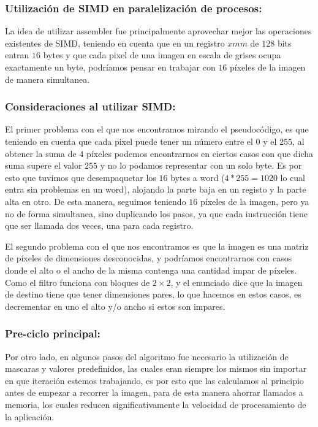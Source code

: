 \subsubsection{Utilización de SIMD en paralelización de procesos:}

La idea de utilizar assembler fue principalmente aprovechar mejor las operaciones existentes de SIMD, teniendo en cuenta que en un registro $xmm$ de $128$ bits entran $16$ bytes y que cada pixel de una imagen en escala de grises ocupa exactamente un byte, podríamos pensar en trabajar con $16$ píxeles de la imagen de manera simultanea. 


\subsubsection{Consideraciones al utilizar SIMD:}

El primer problema con el que nos encontramos mirando el pseudocódigo, es que teniendo en cuenta que cada pixel puede tener un número entre el $0$ y el $255$, al obtener la suma de $4$ píxeles podemos encontrarnos en ciertos casos con que dicha suma supere el valor $255$ y no lo podamos representar con un solo byte. Es por esto que tuvimos que desempaquetar los $16$ bytes a word ($4*255 = 1020$ lo cual entra sin problemas en un word), alojando la parte baja en un registo y la parte alta en otro. De esta manera, seguimos teniendo $16$ píxeles de la imagen, pero ya no de forma simultanea, sino duplicando los pasos, ya que cada instrucción tiene que ser llamada dos veces, una para cada registro.

El segundo problema con el que nos encontramos es que la imagen es una matriz de píxeles de dimensiones desconocidas, y podríamos encontrarnos con casos donde el alto o el ancho de la misma contenga una cantidad impar de píxeles. Como el filtro funciona con bloques de $2 \times 2$, y el enunciado dice que la imagen de destino tiene que tener dimensiones pares, lo que hacemos en estos casos, es decrementar en uno el alto y/o ancho si estos son impares.


\subsubsection{Pre-ciclo principal:}

Por otro lado, en algunos pasos del algoritmo fue necesario la utilización de mascaras y valores predefinidos, las cuales eran siempre los mismos sin importar en que iteración estemos trabajando, es por esto que las calculamos al principio antes de empezar a recorrer la imagen, para de esta manera ahorrar llamados a memoria, los cuales reducen significativamente la velocidad de procesamiento de la aplicación.

